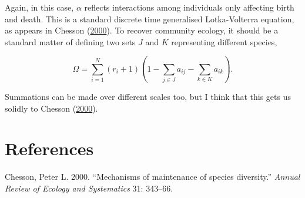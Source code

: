 \documentclass[
]{article}
\newlength{\cslhangindent}
\newlength{\cslentryspacingunit} %
\newenvironment{CSLReferences}[2] %
 {%
  \setlength{\parindent}{0pt}
  \ifodd #1
  \let\oldpar\par
  \def\par{\hangindent=\cslhangindent\oldpar}
  \fi
  \setlength{\parskip}{#2\cslentryspacingunit}
 }%
 {}
\begin{document}
Again, in this case, \(\alpha\) reflects interactions among individuals
only affecting birth and death. This is a standard discrete time
generalised Lotka-Volterra equation, as appears in Chesson
(\protect\hyperlink{ref-Chesson2000b}{2000}). To recover community
ecology, it should be a standard matter of defining two sets \(J\) and
\(K\) representing different species,

\[\Omega = \sum_{i=1}^{N} \left(r_{i} + 1 \right)\left(1 - \sum_{j \in J}a_{ij} - \sum_{k \in K}a_{ik} \right).\]

Summations can be made over different scales too, but I think that this
gets us solidly to Chesson (\protect\hyperlink{ref-Chesson2000b}{2000}).

\hypertarget{references}{%
\section*{References}\label{references}}

\hypertarget{refs}{}
\begin{CSLReferences}{1}{0}
\leavevmode{}%
Chesson, Peter L. 2000. {``{Mechanisms of maintenance of species
diversity}.''} \emph{Annual Review of Ecology and Systematics} 31:
343--66.

\end{CSLReferences}
\end{document}
